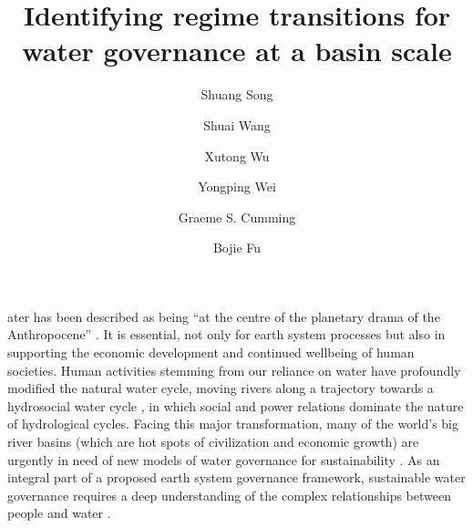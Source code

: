 \documentclass[9pt, twocolumn, twoside, lineno]{pnas-new}
\title{Identifying regime transitions for water governance at a basin scale}
\author[a, b]{Shuang Song}  %
\author[a, b]{Shuai Wang}  %
\author[c, d]{Xutong Wu}  %
\author[e]{Yongping Wei} %
\author{Graeme S. Cumming} %
\author[a, b, 1]{Bojie Fu}  %
\affil[a]{ %
	State Key Laboratory of Earth Surface Processes and Resource Ecology, 
	Faculty of Geographical Science, 
	Beijing Normal University, 
	Beijing 100875, 
	P.R. China
}
\affil[b]{ %
	Institute of Land Surface System and Sustainability, 
	Faculty of Geographical Science, 
	Beijing Normal University, 
	Beijing 100875, 
	P.R. China
}
\affil[c]{ %
	College of Urban and Environmental Sciences, 
	Peking University, 
	Beijing 100871, 
	P.R. China
}
\affil[d]{ %
	State Key Laboratory of Urban and Regional Ecology, 
	Research Center for Eco-Environmental Sciences, 
	Chinese Academy of Sciences, 
	Beijing 100085, 
	P.R. China 
}
\affil[e]{ %
	School of Earth and Environmental Sciences, 
	The University of Queensland, 
	Brisbane 4067, 
	Australia
}
\begin{document}
\maketitle
\thispagestyle{firststyle}

\label{introduction-section-1}
ater has been described as being “at the centre of the planetary drama of the Anthropocene” \cite{gleeson2020}.
It is essential, not only for earth system processes but also in supporting the economic development and continued wellbeing of human societies. Human activities stemming from our reliance on water have profoundly modified the natural water cycle, moving rivers along a trajectory towards a hydrosocial water cycle
\cite{gleeson2020,sivapalan2012,qin2014,abbott2019,levia2020}, in which social and power relations dominate the nature of hydrological cycles.
Facing this major transformation, many of the world’s big river basins (which are hot spots of civilization and economic growth) are urgently in need of new models of water governance for sustainability
\cite{bestAnthropogenicStressesWorld2019,falkenmark2019,dibaldassarre2019}. 
As an integral part of a proposed earth system governance framework, sustainable water governance requires a deep understanding of the complex relationships between people and water
\cite{biermann2012,steffen2020,dibaldassarre2019}.
\end{document}
